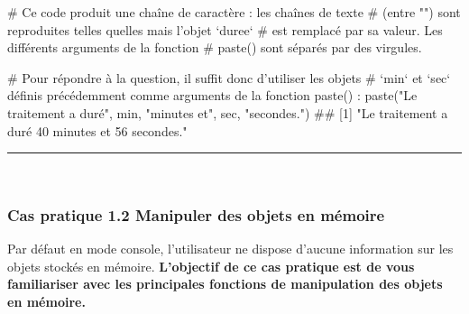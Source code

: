 \documentclass[12pt,twosided, notitlepage]{book}
\newenvironment{Shaded}{}{}
\newcommand{\KeywordTok}[1]{\textcolor[rgb]{0.00,0.00,1.00}{#1}}
\newcommand{\StringTok}[1]{\textcolor[rgb]{0.00,0.50,0.50}{#1}}
\newcommand{\CommentTok}[1]{\textcolor[rgb]{0.00,0.50,0.00}{#1}}
\newcommand{\NormalTok}[1]{#1}
\renewenvironment{Shaded}{\begin{snugshade}}{\end{snugshade}}
\begin{document}
\begin{enumerate}
\begin{Shaded}
\begin{Highlighting}[]
\CommentTok{# Ce code produit une chaîne de caractère : les chaînes de texte}
\CommentTok{# (entre "") sont reproduites telles quelles mais l'objet `duree`}
\CommentTok{# est remplacé par sa valeur. Les différents arguments de la fonction}
\CommentTok{# paste() sont séparés par des virgules.}

\CommentTok{# Pour répondre à la question, il suffit donc d'utiliser les objets}
\CommentTok{# `min` et `sec` définis précédemment comme arguments de la fonction paste() :}
\KeywordTok{paste}\NormalTok{(}\StringTok{"Le traitement a duré"}\NormalTok{, min, }\StringTok{"minutes et"}\NormalTok{, sec, }\StringTok{"secondes."}\NormalTok{)}
\NormalTok{  ## [1] "Le traitement a duré 40 minutes et 56 secondes."}
\end{Highlighting}
\end{Shaded}

  \begin{center} \rule{0.5\linewidth}{\linethickness}\end{center}

  \bigskip  \fi 
\end{enumerate}

~

\subsubsection{\texorpdfstring{\textbf{Cas pratique 1.2} Manipuler des
objets en
mémoire}{Cas pratique 1.2 Manipuler des objets en mémoire}}\label{cas-pratique-1.2-manipuler-des-objets-en-memoire}

Par défaut en mode console, l'utilisateur ne dispose d'aucune
information sur les objets stockés en mémoire. \textbf{L'objectif de ce
cas pratique est de vous familiariser avec les principales fonctions de
manipulation des objets en mémoire.}
\end{document}
